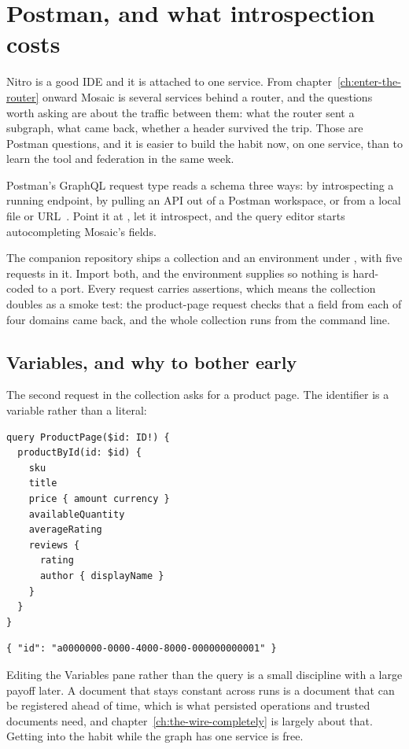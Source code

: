 \section{Postman, and what introspection costs}
\label{sec:ch02-postman}

Nitro is a good IDE and it is attached to one service. From
chapter~\ref{ch:enter-the-router} onward Mosaic is several services behind a
router, and the questions worth asking are about the traffic between them: what
the router sent a subgraph, what came back, whether a header survived the trip.
Those are Postman questions, and it is easier to build the habit now, on one
service, than to learn the tool and federation in the same week.

Postman's GraphQL request type reads a schema three ways: by introspecting a
running endpoint, by pulling an API out of a Postman workspace, or from a local
file or URL~\autocite{postman2026client}. Point it at
, let it introspect, and the query editor
starts autocompleting Mosaic's fields.

The companion repository ships a collection and an environment under
, with five requests in it. Import both, and the environment
supplies  so nothing is hard-coded to a port. Every request
carries assertions, which means the collection doubles as a smoke test: the
product-page request checks that a field from each of four domains came back,
and the whole collection runs from the command line.

\subsection*{Variables, and why to bother early}

The second request in the collection asks for a product page. The identifier is
a variable rather than a literal:

\begin{verbatim}
query ProductPage($id: ID!) {
  productById(id: $id) {
    sku
    title
    price { amount currency }
    availableQuantity
    averageRating
    reviews {
      rating
      author { displayName }
    }
  }
}
\end{verbatim}

\begin{verbatim}
{ "id": "a0000000-0000-4000-8000-000000000001" }
\end{verbatim}

Editing the Variables pane rather than the query is a small discipline with a
large payoff later. A document that stays constant across runs is a document
that can be registered ahead of time, which is what persisted operations and
trusted documents need, and chapter~\ref{ch:the-wire-completely} is largely
about that. Getting into the habit while the graph has one service is free.

